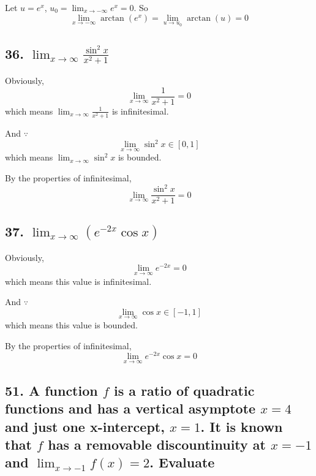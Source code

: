 \documentclass{article}
\begin{document}
    Let $u = e^x$, $u_0 = \lim_{x \to -\infty}e^x = 0$. So $$\lim_{x \to -\infty}\arctan(e^x) = \lim_{u \to u_0}\arctan(u) = 0$$

    \subsection*{36. $\lim_{x \to \infty}\frac{\sin^2 x}{x^2 + 1}$}

    Obviously, $$\lim_{x \to \infty} \frac{1}{x^2 + 1} = 0$$ which means $\lim_{x \to \infty}\frac{1}{x^2 + 1}$ is infinitesimal.

    And $\because$ $$\lim_{x \to \infty}\sin ^2 x \in [0, 1]$$ which means $\lim_{x \to \infty}\sin^2 x$ is bounded.

    By the properties of infinitesimal, $$\lim_{x \to \infty}\frac{\sin^2 x}{x ^2 + 1} = 0$$

    \subsection*{37. $\lim_{x \to \infty}(e^{-2x} \cos x)$}

    Obviously, $$\lim_{x \to \infty} e^{-2x} = 0$$ which means this value is infinitesimal.

    And $\because$ $$\lim_{x \to \infty}\cos x \in [-1, 1]$$ which means this value is bounded.

    By the properties of infinitesimal, $$\lim_{x \to \infty}e^{-2x}\cos x = 0$$

    \subsection*{51. A function $f$ is a ratio of quadratic functions and has a vertical asymptote $x = 4$ and just one x-intercept, $x=1$. It is known that $f$ has a removable discountinuity at $x = -1$ and $\lim_{x \to -1}f(x) = 2$. Evaluate}
\end{document}

